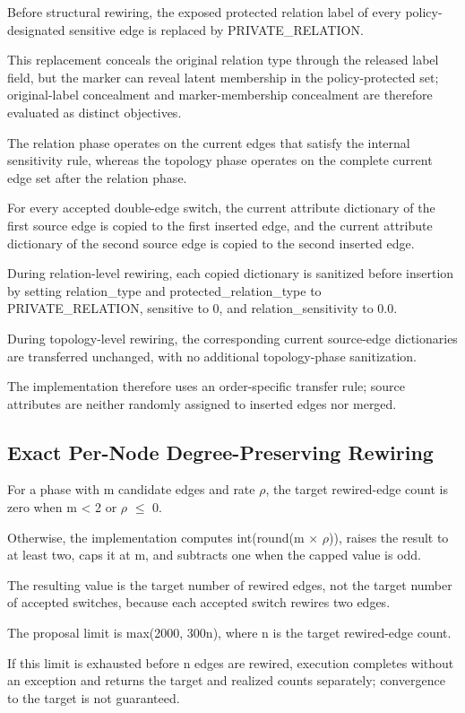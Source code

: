 \documentclass[preprint,12pt]{elsarticle}
\begin{document}
Before structural rewiring, the exposed protected relation label of every policy-designated sensitive edge is replaced by PRIVATE\_RELATION.

This replacement conceals the original relation type through the released label field, but the marker can reveal latent membership in the policy-protected set; original-label concealment and marker-membership concealment are therefore evaluated as distinct objectives.

The relation phase operates on the current edges that satisfy the internal sensitivity rule, whereas the topology phase operates on the complete current edge set after the relation phase.

For every accepted double-edge switch, the current attribute dictionary of the first source edge is copied to the first inserted edge, and the current attribute dictionary of the second source edge is copied to the second inserted edge.

During relation-level rewiring, each copied dictionary is sanitized before insertion by setting relation\_type and protected\_relation\_type to PRIVATE\_RELATION, sensitive to 0, and relation\_sensitivity to 0.0.

During topology-level rewiring, the corresponding current source-edge dictionaries are transferred unchanged, with no additional topology-phase sanitization.

The implementation therefore uses an order-specific transfer rule; source attributes are neither randomly assigned to inserted edges nor merged.

\subsection{Exact Per-Node Degree-Preserving Rewiring}
For a phase with m candidate edges and rate $\rho$, the target rewired-edge count is zero when m < 2 or $\rho$ $\leq$ 0.

Otherwise, the implementation computes int(round(m $\times$ $\rho$)), raises the result to at least two, caps it at m, and subtracts one when the capped value is odd.

The resulting value is the target number of rewired edges, not the target number of accepted switches, because each accepted switch rewires two edges.

The proposal limit is max(2000, 300n), where n is the target rewired-edge count.

If this limit is exhausted before n edges are rewired, execution completes without an exception and returns the target and realized counts separately; convergence to the target is not guaranteed.
\end{document}
